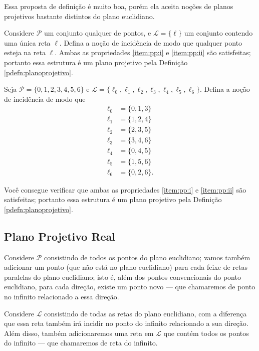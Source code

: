 Essa proposta de definição é muito boa, porém ela aceita noções de planos projetivos bastante distintos do plano euclidiano.

\begin{exmp}
	Considere \(\mathcal P\) um conjunto qualquer de pontos, e \(\mathcal L = \{\ell\}\) um conjunto contendo uma única reta \(\ell\).
	Defina a noção de incidência de modo que qualquer ponto esteja na reta \(\ell\).
	Ambas as propriedades \ref{item:pp:i} e \ref{item:pp:ii} são satisfeitas; portanto essa estrutura é um plano projetivo pela Definição \ref{pdefn:planoprojetivo}.
\end{exmp}

\begin{exmp}
	Seja \(\mathcal P = \{0, 1, 2, 3, 4, 5, 6\}\) e \(\mathcal L = \{\ell_0, \ell_1, \ell_2, \ell_3, \ell_4, \ell_5, \ell_6\}\). Defina a noção de incidência de modo que
	\begin{align*}
		\ell_0 &= \{0, 1, 3\} \\
		\ell_1 &= \{1, 2, 4\} \\
		\ell_2 &= \{2, 3, 5\} \\
		\ell_3 &= \{3, 4, 6\} \\
		\ell_4 &= \{0, 4, 5\} \\
		\ell_5 &= \{1, 5, 6\} \\
		\ell_6 &= \{0, 2, 6\}.
	\end{align*}
	
	Você consegue verificar que ambas as propriedades \ref{item:pp:i} e \ref{item:pp:ii} são satisfeitas; portanto essa estrutura é um plano projetivo pela Definição \ref{pdefn:planoprojetivo}.
\end{exmp}

\subsection{Plano Projetivo Real}

Considere \(\mathcal P\) consistindo de todos os pontos do plano euclidiano; vamos também adicionar um ponto (que não está no plano euclidiano) para cada feixe de retas paralelas do plano euclidiano; isto é, além dos pontos convencionais do ponto euclidiano, para cada direção, existe um ponto novo --- que chamaremos de ponto no infinito relacionado a essa direção.

Considere \(\mathcal L\) consistindo de todas as retas do plano euclidiano, com a diferença que essa reta também irá incidir no ponto do infinito relacionado a sua direção. Além disso, também adicionaremos uma reta em \(\mathcal L\) que contém todos os pontos do infinito --- que chamaremos de reta do infinito.

